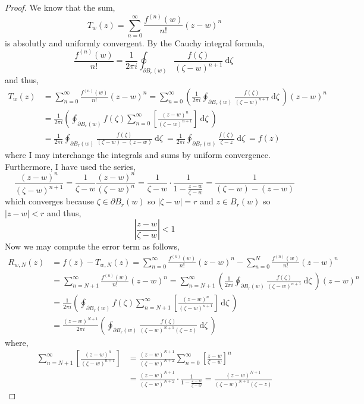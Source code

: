 \documentclass[12pt]{extarticle}
\renewcommand{\d}[1]{\: \mathrm{d}#1 \:}
\theoremstyle{definition}
\begin{document}
\begin{proof}
We know that the sum,
\[ T_w(z) = \sum_{n = 0}^\infty \frac{f^{(n)}(w)}{n!} (z - w)^n \]
is absolutly and uniformly convergent. By the Cauchy integral formula,
\[ \frac{f^{(n)}(w)}{n!} = \frac{1}{2 \pi i} \oint_{\partial B_r(w)} \frac{f(\zeta)}{(\zeta - w)^{n+1}} \d{\zeta} \]
and thus,
\begin{align*}
T_w(z) & = \sum_{n = 0}^\infty \frac{f^{(n)}(w)}{n!} (z - w)^n = \sum_{n = 0}^\infty  \left( \frac{1}{2 \pi i} \oint_{\partial B_r(w)} \frac{f(\zeta)}{(\zeta - w)^{n+1}} \d{\zeta} \right) (z - w)^n
\\
& = \frac{1}{2 \pi i } \left( \oint_{\partial B_r(w)} f(\zeta) \sum_{n = 0}^\infty \left[ \frac{(z - w)^n}{(\zeta - w)^{n+1}}   \right] \d{\zeta} \right)
\\
& = \frac{1}{2 \pi i} \oint_{\partial B_r(w)}  \frac{f(\zeta)}{(\zeta - w) - (z - w)} \d{\zeta} = \frac{1}{2 \pi i} \oint_{\partial B_r(w)} \frac{f(\zeta)}{\zeta - z} \d{\zeta} = f(z) 
\end{align*}
where I may interchange the integrals and sums by uniform convergence. Furthermore, I have used the series,
\[  \frac{(z - w)^n}{(\zeta - w)^{n+1}} = \frac{1}{\zeta - w} \frac{(z - w)^n}{(\zeta - w)^{n}} =  \frac{1}{\zeta - w} \cdot \frac{1}{1 - \frac{z - w}{\zeta - w}} = \frac{1}{(\zeta - w) - (z - w)} \]
which converges because $\zeta \in \partial B_r(w)$ so $|\zeta - w| = r$ and $z \in B_r(w)$ so $|z - w| < r$ and thus,
\[ \left| \frac{z - w}{\zeta - w} \right| < 1 \]
Now we may compute the error term as follows,
\begin{align*}
R_{w, N}(z) & = f(z) - T_{w, N}(z) = \sum_{n = 0}^\infty \frac{f^{(n)}(w)}{n!} (z - w)^n  - \sum_{n = 0}^N \frac{f^{(n)}(w)}{n!} (z - w)^n 
\\
& = \sum_{n = {N+1}}^\infty \frac{f^{(n)}(w)}{n!} (z - w)^n  = \sum_{n = {N+1}}^\infty  \left( \frac{1}{2 \pi i} \oint_{\partial B_r(w)} \frac{f(\zeta)}{(\zeta - w)^{n+1}} \d{\zeta} \right) (z - w)^n
\\
& = \frac{1}{2 \pi i } \left( \oint_{\partial B_r(w)} f(\zeta) \sum_{n = {N+1}}^\infty \left[ \frac{(z - w)^n}{(\zeta - w)^{n+1}}   \right] \d{\zeta} \right)
\\
& = \frac{(z - w)^{N+1}}{2 \pi i} \left( \oint_{\partial B_r(w)}  \frac{f(\zeta)}{(\zeta - w)^{N+1} (\zeta - z)}  \d{\zeta} \right) 
\end{align*}
where,
\begin{align*}
\sum_{n = {N+1}}^\infty \left[ \frac{(z - w)^n}{(\zeta - w)^{n+1}}   \right] & = \frac{(z - w)^{N+1}}{(\zeta - w)^{N+2}} \sum_{n = 0}^\infty \left[ \frac{z - w}{\zeta - w} \right]^n 
\\
& = \frac{(z - w)^{N+1}}{(\zeta - w)^{N+2}} \cdot \frac{1}{1 - \frac{z - w}{\zeta - w}} = \frac{(z - w)^{N+1}}{(\zeta - w)^{N+1} (\zeta - z)} 
\end{align*}
\end{proof}
\end{document}
